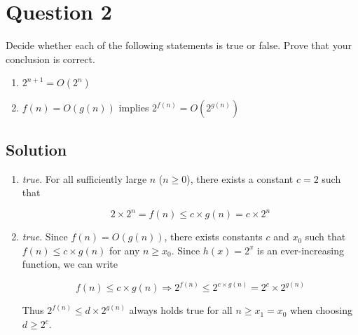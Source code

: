 
\section*{Question 2}
Decide whether each of the following statements is true or false. Prove that your conclusion is correct.
\begin{enumerate}[label=(\alph*)]
\item $2^{n+1} = O(2^n)$
\item $f(n) = O(g(n))$ implies $2^{f(n)} = O(2^{g(n)})$
\end{enumerate}

\subsection*{Solution}
\begin{enumerate}[label=(\alph*)]
\item \textit{true}. For all sufficiently large $n$ ($n \geq 0$), there exists a constant $c = 2$ such that 

\begin{equation}
2 \times 2^n = f(n) \leq c \times g(n) = c \times 2^n
\end{equation}

\item \textit{true}. Since $f(n) = O(g(n))$, there exists constants $c$ and $x_0$ such that $f(n) \leq c \times g(n)$ for any $n \geq x_0$. Since $h(x) = 2^x$ is an ever-increasing function, we can write

\begin{equation}
f(n) \leq c \times g(n) \Rightarrow 2^{f(n)} \leq 2^{c \times g(n)} = 2^c \times 2^{g(n)}
\end{equation}

Thus $2^{f(n)} \leq d \times 2^{g(n)}$ always holds true for all $n \geq x_1 = x_0$ when choosing $d \geq 2^c$.

\end{enumerate}
